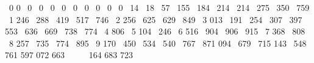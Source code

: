 \documentclass[12pt,twoside]{article}
\begin{document}
~0 {\textbar} 0~ 0~ 0~ 0~ 0~ 0~ 0~ 0~ 0~ 0~ 14~ 18~ 57~ 155~ 184~ 214~
214~ 275~ 350~ 759\newline
~1 {\textbar} 246~ 288~ 419~ 517~ 746\newline
~2 {\textbar} 256~ 625~ 629~ 849\newline
~3 {\textbar} 013~ 191~ 254~ 307~ 397~ 553~ 636~ 669~ 738~ 774\newline
~4 {\textbar} 806\newline
~5 {\textbar} 104~ 246\newline
~6 {\textbar} 516~ 904~ 906~ 915\newline
~7 {\textbar} 368~ 808\newline
~8 {\textbar} 257~ 735~ 774~ 895\newline
~9 {\textbar} {\textbar} 170~ 450~ 534~ 540~ 767~ 871 {\textbar} 094~ 679~ 715 {\textbar} 143~ 548~ 761 {\textbar} {\textbar} {\textbar} {\textbar} {\textbar} {\textbar} 597 {\textbar} 072 {\textbar} {\textbar} {\textbar} {\textbar} 663 {\textbar} {\textbar} ~ {\textbar} {\textbar} {\textbar} {\textbar} {\textbar}~ ~ {\textbar} {\textbar} {\textbar} {\textbar} {\textbar} {\textbar} {\textbar} {\textbar} 164 {\textbar} {\textbar} {\textbar} {\textbar} 683 {\textbar} {\textbar} {\textbar} {\textbar} {\textbar} {\textbar} 723
\end{document}
